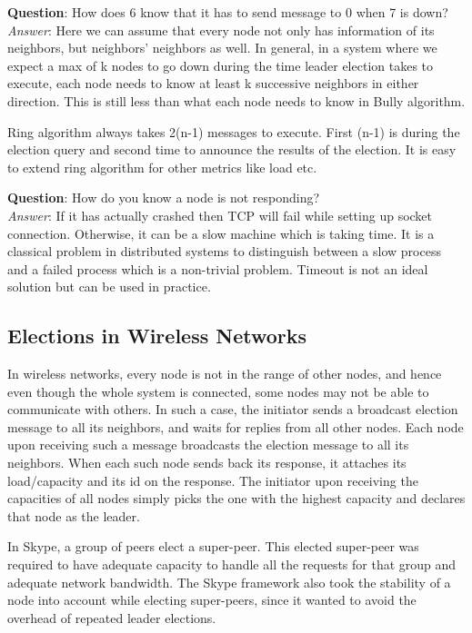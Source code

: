 \documentclass[twoside]{article}
\begin{document}
\textbf{Question}: How does 6 know that it has to send message to 0 when 7 is down?\\
\emph{Answer}: Here we can assume that every node not only has information of its neighbors, but neighbors' neighbors as well. In general, in a system where we expect a max of k nodes to go down during the time leader election takes to execute, each node needs to know at least k successive neighbors in either direction. This is still less than what each node needs to know in Bully algorithm.

Ring algorithm always takes 2(n-1) messages to execute. First (n-1) is during the election query and second time to announce the results of the election. It is easy to extend ring algorithm for other metrics like load etc.

\textbf{Question}: How do you know a node is not responding?\\
\emph{Answer}: If it has actually crashed then TCP will fail while setting up socket connection. Otherwise, it can be a slow machine which is taking time. It is a classical problem in distributed systems to distinguish between a slow process and a failed process which is a non-trivial problem. Timeout is not an ideal solution but can be used in practice.

\subsection{Elections in Wireless Networks}
In wireless networks, every node is not in the range of other nodes, and hence even though the whole system is connected, some nodes may not be able to communicate with others. In such a case, the initiator sends a broadcast election message to all its neighbors, and waits for replies from all other nodes. Each node upon receiving such a message broadcasts the election message to all its neighbors. When each such node sends back its response, it attaches its load/capacity and its id on the response. The initiator upon receiving the capacities of all nodes simply picks the one with the highest capacity and declares that node as the leader.

In Skype, a group of peers elect a super-peer. This elected super-peer was required to have adequate capacity to handle all the requests for that group and adequate network bandwidth. The Skype framework also took the stability of a node into account while electing super-peers, since it wanted to avoid the overhead of repeated leader elections.
\end{document}
